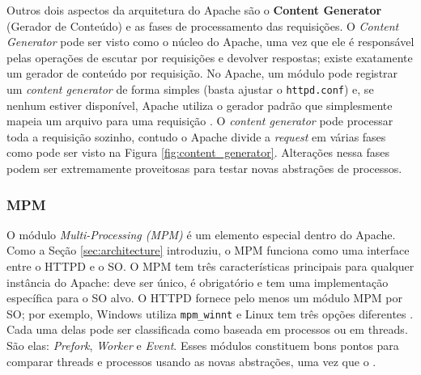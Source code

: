 Outros dois aspectos da arquitetura do Apache são o \textbf{Content Generator}
(Gerador de Conteúdo) e as fases de processamento das requisições. O
\emph{Content Generator} pode ser visto como o núcleo do Apache, uma vez que
ele é responsável pelas operações de escutar por requisições e devolver
respostas; existe exatamente um gerador de conteúdo por requisição. No Apache,
um módulo pode registrar um \emph{content generator} de forma simples (basta
ajustar o \texttt{httpd.conf}) e, se nenhum estiver disponível, Apache utiliza
o gerador padrão que simplesmente mapeia um arquivo para uma requisição
\citep{apache_module_book}. O \emph{content generator} pode processar toda a
requisição sozinho, contudo o Apache divide a \emph{request} em várias fases
como pode ser visto na Figura \ref{fig:content_generator}. Alterações nessa
fases podem ser extremamente proveitosas para testar novas abstrações de
processos.

\subsubsection{MPM}
\label{sec:prefork}

O módulo \emph{Multi-Processing (MPM)} é um elemento especial dentro do
Apache. Como a Seção \ref{sec:architecture} introduziu, o MPM funciona como uma
interface entre o HTTPD e o SO. O MPM tem três características principais para
qualquer instância do Apache: deve ser único, é obrigatório e tem uma
implementação específica para o SO alvo. O HTTPD fornece pelo menos um módulo
MPM por SO; por exemplo, Windows utiliza \texttt{mpm\_winnt} e Linux tem
três opções diferentes . Cada uma
delas pode ser classificada como baseada em processos ou em
threads. São elas: \emph{Prefork}, \emph{Worker} e
\emph{Event}. Esses módulos constituem bons pontos para comparar threads e
processos usando as novas abstrações, uma vez que o .

